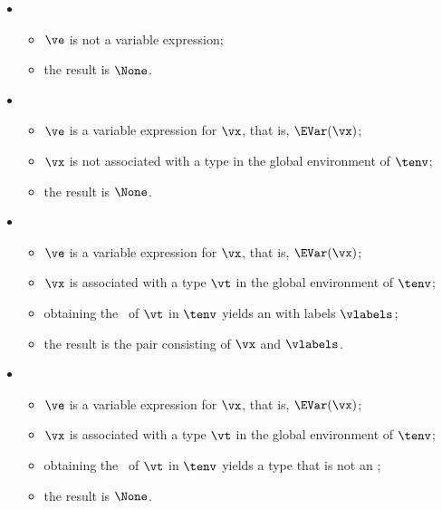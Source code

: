 \ProseParagraph
\OneApplies
\begin{itemize}
  \item {}
  \begin{itemize}
    \item $\ve$ is not a variable expression;
    \item the result is $\None$.
  \end{itemize}

  \item {}
  \begin{itemize}
    \item $\ve$ is a variable expression for $\vx$, that is, $\EVar(\vx)$;
    \item $\vx$ is not associated with a type in the global environment of $\tenv$;
    \item the result is $\None$.
  \end{itemize}

  \item {}
  \begin{itemize}
    \item $\ve$ is a variable expression for $\vx$, that is, $\EVar(\vx)$;
    \item $\vx$ is associated with a type $\vt$ in the global environment of $\tenv$;
    \item obtaining the \underlyingtypeterm\ of $\vt$ in $\tenv$ yields an \enumerationtypeterm{} with labels $\vlabels$;
    \item the result is the pair consisting of $\vx$ and $\vlabels$.
  \end{itemize}

  \item {}
  \begin{itemize}
    \item $\ve$ is a variable expression for $\vx$, that is, $\EVar(\vx)$;
    \item $\vx$ is associated with a type $\vt$ in the global environment of $\tenv$;
    \item obtaining the \underlyingtypeterm\ of $\vt$ in $\tenv$ yields a type that is not an \enumerationtypeterm{};
    \item the result is $\None$.
  \end{itemize}
\end{itemize}

\FormallyParagraph
\begin{mathpar}
\end{mathpar}

